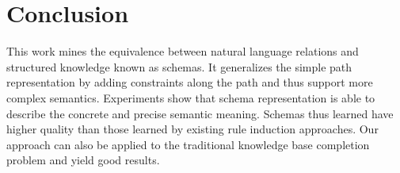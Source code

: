 \section{Conclusion}
This work mines the equivalence between natural language relations and structured 
knowledge known as schemas.  It generalizes the simple path representation 
by adding constraints along the path and thus support more complex semantics.
Experiments show that schema representation is able to describe the concrete 
and precise semantic meaning. Schemas thus learned have higher quality than
those learned by existing rule induction approaches. Our approach can also be applied
to the traditional knowledge base completion problem and yield good results. 
%
%
